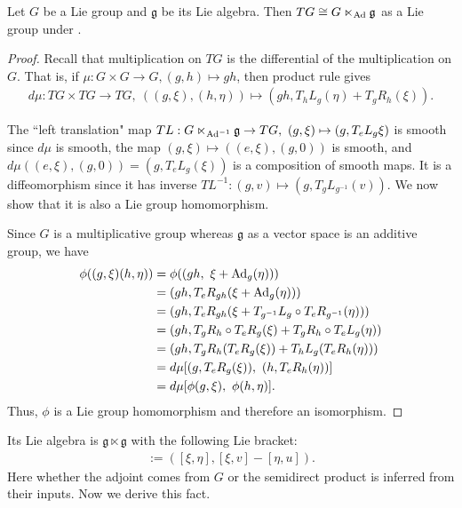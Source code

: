 \documentclass[12pt,class=article,crop=false]{standalone}
\begin{document}
\begin{prop} 
Let $ G$ be a Lie group and  $ \mathfrak{ g }$ be its Lie algebra. Then $ TG \cong G\ltimes_{ \operatorname{Ad}} \mathfrak{ g} $ as a Lie group under .
\end{prop}

\begin{proof}
Recall that multiplication on $ TG$ is the differential of the multiplication on $ G$. That is, if $ \mu: G \times G \to G, (g,h) \mapsto gh$, then product rule gives
\begin{align*}
	d\mu : TG \times TG \to TG,\ ((g, \xi) , (h, \eta)) \mapsto (gh, T_hL_g (\eta) + T_g R_h (\xi)).
\end{align*}

The ``left translation" map $ TL: G\ltimes_{ \operatorname{Ad}^{-1}} \mathfrak{ g} \to TG,\ (g,\xi) \mapsto (g,T_eL_g \xi)$ is smooth since $d\mu$ is smooth, the map $(g,\xi) \mapsto  ((e,\xi),(g,0))$ is smooth, and $ d\mu ((e,\xi),(g,0)) = (g, T_eL_g(\xi) )$ is a composition of smooth maps. It is a diffeomorphism since it has inverse $TL^{-1}: (g, v) \mapsto (g,T_g L_{g^{-1}}(v))$. We now show that it is also a Lie group homomorphism.

Since $G$ is a multiplicative group whereas $\mathfrak{g}$ as a vector space is an additive group, we have
\begin{align*}
    \phi((g,\xi)(h,\eta)) &= \phi((gh,\ \xi + \operatorname{Ad}_g(\eta)))\\
    &=(gh, T_e R_{gh}(\xi + \operatorname{Ad}_g(\eta)))\\
    &= (gh, T_e R_{gh} (\xi+ T_{g^{-1}}L_g \circ T_e R_{g^{-1}} (\eta)))\\
    &= (gh, T_gR_h \circ T_e R_g(\xi) + T_gR_h \circ T_eL_g(\eta))\\
    &= (gh, T_gR_h ( T_eR_g(\xi)) + T_hL_g (T_eR_h (\eta)))\\
    &= d\mu [(g, T_e R_g(\xi)) ,\ (h,T_eR_h (\eta)) ]\\
    &= d\mu [\phi(g,\xi) ,\ \phi(h,\eta)].
\end{align*}
Thus, $\phi$ is a Lie group homomorphism and therefore an isomorphism.
\end{proof}

Its Lie algebra is $ \mathfrak{g} \ltimes \mathfrak{g}$ with the following Lie bracket:
\begin{align*}
	[(\xi, u), (\eta,v)] := \left( [\xi, \eta], [\xi,v ] - [\eta, u] \right) .
\end{align*}
Here whether the adjoint comes from $ G$ or the semidirect product is inferred from their inputs. Now we derive this fact.
\end{document}
